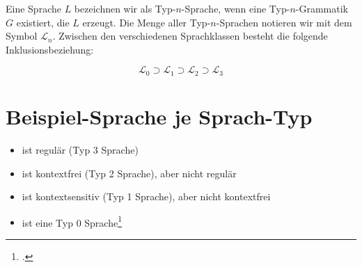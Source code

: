 \documentclass{lehramt-informatik-haupt}
\begin{document}
\begin{center}
\end{center}

\noindent
Eine Sprache $L$ bezeichnen wir als Typ-$n$-Sprache, wenn eine
Typ-$n$-Grammatik $G$ existiert, die $L$ erzeugt. Die Menge aller
Typ-$n$-Sprachen notieren wir mit dem Symbol $\mathcal{L}_n$. Zwischen
den verschiedenen Sprachklassen besteht die folgende
Inklusionsbeziehung:

\begin{displaymath}
\mathcal{L}_0 \supset \mathcal{L}_1 \supset \mathcal{L}_2 \supset \mathcal{L}_3
\end{displaymath}

%

\section{Beispiel-Sprache je Sprach-Typ}

\begin{itemize}
\item {}
ist regulär (Typ 3 Sprache)

\item {}
ist kontextfrei (Typ 2 Sprache), aber nicht regulär

\item {}
ist kontextsensitiv (Typ 1 Sprache), aber nicht kontextfrei

\item {}
ist eine Typ 0 Sprache\footcite[Seite 15]{theo:fs:1}
\end{itemize}
\end{document}
